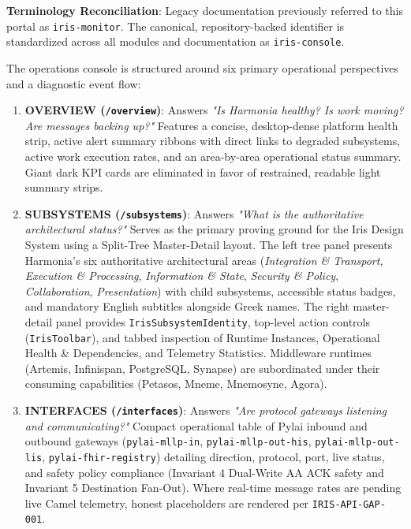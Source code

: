 \begin{archinote}
\textbf{Terminology Reconciliation}: Legacy documentation previously referred to this portal as \texttt{iris-monitor}. The canonical, repository-backed identifier is standardized across all modules and documentation as \texttt{iris-console}.
\end{archinote}

The operations console is structured around six primary operational perspectives and a diagnostic event flow:
\begin{enumerate}
    \item \textbf{OVERVIEW (\texttt{/overview})}: Answers \textit{"Is Harmonia healthy? Is work moving? Are messages backing up?"} Features a concise, desktop-dense platform health strip, active alert summary ribbons with direct links to degraded subsystems, active work execution rates, and an area-by-area operational status summary. Giant dark KPI cards are eliminated in favor of restrained, readable light summary strips.
    \item \textbf{SUBSYSTEMS (\texttt{/subsystems})}: Answers \textit{"What is the authoritative architectural status?"} Serves as the primary proving ground for the Iris Design System using a Split-Tree Master-Detail layout. The left tree panel presents Harmonia's six authoritative architectural areas (\textit{Integration \& Transport}, \textit{Execution \& Processing}, \textit{Information \& State}, \textit{Security \& Policy}, \textit{Collaboration}, \textit{Presentation}) with child subsystems, accessible status badges, and mandatory English subtitles alongside Greek names. The right master-detail panel provides \texttt{IrisSubsystemIdentity}, top-level action controls (\texttt{IrisToolbar}), and tabbed inspection of Runtime Instances, Operational Health \& Dependencies, and Telemetry Statistics. Middleware runtimes (Artemis, Infinispan, PostgreSQL, Synapse) are subordinated under their consuming capabilities (Petasos, Mneme, Mnemosyne, Agora).
    \item \textbf{INTERFACES (\texttt{/interfaces})}: Answers \textit{"Are protocol gateways listening and communicating?"} Compact operational table of Pylai inbound and outbound gateways (\texttt{pylai-mllp-in}, \texttt{pylai-mllp-out-his}, \texttt{pylai-mllp-out-lis}, \texttt{pylai-fhir-registry}) detailing direction, protocol, port, live status, and safety policy compliance (Invariant 4 Dual-Write AA ACK safety and Invariant 5 Destination Fan-Out). Where real-time message rates are pending live Camel telemetry, honest placeholders are rendered per \texttt{IRIS-API-GAP-001}.

\end{enumerate}
